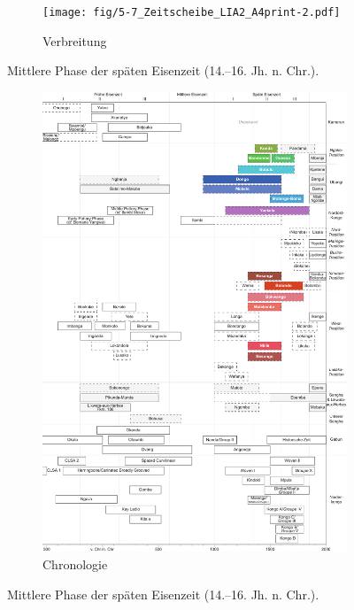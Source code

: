 \begin{figure}[p]
	\centering
	\begin{subfigure}[b]{\textwidth}
		\centering
		\texttt{[image: fig/5-7\_Zeitscheibe\_LIA2\_A4print-2.pdf]}
		\vspace{4cm}
		\caption{Verbreitung}
		\label{fig:LIA2_Karte}
	\end{subfigure}
	\caption{Mittlere Phase der späten Eisenzeit (14.--16. Jh. n. Chr.).}
	\label{fig:}
\end{figure}
\addtocounter{figure}{-1}
\begin{figure}[p]
	\begin{subfigure}[b]{\textwidth}
		\setcounter{subfigure}{1}
		\centering
		\includegraphics[height = .9\textheight]{fig/Chronologiesystem_v4_Zeitscheibe_LIA2.pdf}
		\caption{Chronologie}
		\label{fig:LIA2_Chronologie}
	\end{subfigure}
	\caption{Mittlere Phase der späten Eisenzeit (14.--16. Jh. n. Chr.).}
	\label{fig:LIA2}
\end{figure}

